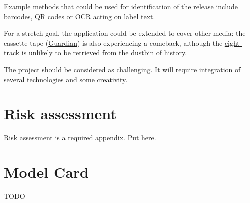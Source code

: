 \begin{uomappendix}
            Example methods that could be used for identification of the release include barcodes, QR codes or OCR acting on label text.
            
            For a stretch goal, the application could be extended to cover other media: the cassette tape (\href{https://www.theguardian.com/music/2023/apr/20/fun-way-consume-music-why-sales-of-cassette-tapes-soaring}{Guardian}) is also experiencing a comeback, although the \href{https://en.wikipedia.org/wiki/8-track_cartridge}{eight-track} is unlikely to be retrieved from the dustbin of history.
            
            The project should be considered as challenging. It will require integration of several technologies and some creativity.
        
        \section{Risk assessment}
            \begin{temp}
                Risk assessment is a required appendix. Put here.
            \end{temp}
    
        \section{Model Card}
            \begin{temp}
                TODO
            \end{temp}
        
    \end{uomappendix}
    
    
    
